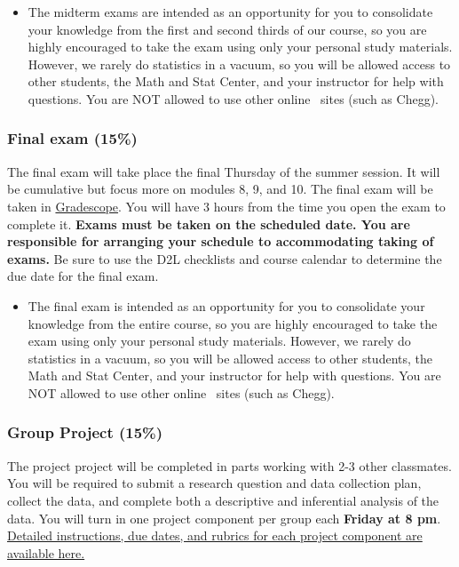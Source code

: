 \documentclass[
]{article}
\providecommand{\tightlist}{%
  \setlength{\itemsep}{0pt}\setlength{\parskip}{0pt}}
\begin{document}
\begin{itemize}
\tightlist
\item
  The midterm exams are intended as an opportunity for you to
  consolidate your knowledge from the first and second thirds of our
  course, so you are highly encouraged to take the exam using only your
  personal study materials. However, we rarely do statistics in a
  vacuum, so you will be allowed access to other students, the Math and
  Stat Center, and your instructor for help with questions. You are NOT
  allowed to use other online \tutoring~sites (such as Chegg).
\end{itemize}

\subsubsection{Final exam (15\%)}\label{final-exam-15}

The final exam will take place the final Thursday of the summer session.
It will be cumulative but focus more on modules 8, 9, and 10. The final
exam will be taken in \href{https://www.gradescope.com/}{Gradescope}.
You will have 3 hours from the time you open the exam to complete it.
\textbf{Exams must be taken on the scheduled date. You are responsible
for arranging your schedule to accommodating taking of exams.} Be sure
to use the D2L checklists and course calendar to determine the due date
for the final exam.

\begin{itemize}
\tightlist
\item
  The final exam is intended as an opportunity for you to consolidate
  your knowledge from the entire course, so you are highly encouraged to
  take the exam using only your personal study materials. However, we
  rarely do statistics in a vacuum, so you will be allowed access to
  other students, the Math and Stat Center, and your instructor for help
  with questions. You are NOT allowed to use other online
  \tutoring~sites (such as Chegg).
\end{itemize}

\subsubsection{Group Project (15\%)}\label{group-project-15}

The project project will be completed in parts working with 2-3 other
classmates. You will be required to submit a research question and data
collection plan, collect the data, and complete both a descriptive and
inferential analysis of the data. You will turn in one project component
per group each \textbf{Friday at 8 pm}.
\href{https://docs.google.com/document/d/1M-uz_NFvCF685WA9Gm4wZMDITWx1aRr5bYMWaMVGZNU/edit?usp=sharing}{Detailed
instructions, due dates, and rubrics for each project component are
available here.}
\end{document}
